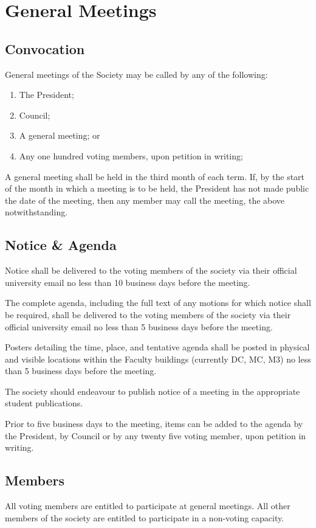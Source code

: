 \section{General Meetings}
\subsection{Convocation}
General meetings of the Society may be called by any of the following:
\begin{enumerate}
  \item The President;
  \item Council;
  \item A general meeting; or
  \item Any one hundred voting members, upon petition in writing;
\end{enumerate}

A general meeting shall be held in the third month of each term. If, by the
start of the month in which a meeting is to be held, the President has not
made public the date of the meeting, then any member may call the meeting, the
above notwithstanding.

\subsection{Notice \& Agenda}

Notice shall be delivered to the voting members of the society via their official university email no less than 10 business days before the meeting.

The complete agenda, including the full text of any motions for which notice shall be required, shall be delivered to the voting members of the society via their official university email no less than 5 business days before the meeting.

Posters detailing the time, place, and tentative agenda shall be posted in physical and visible locations within the Faculty buildings (currently DC, MC, M3) no less than 5 business days before the meeting.

The society should endeavour to publish notice of a meeting in the appropriate student publications.

Prior to five business days to the meeting, items can be added to the agenda by the President, by Council or by any twenty five voting member, upon petition in writing.

\subsection{Members}
All voting members are entitled to participate at general meetings. All other
members of the society are entitled to participate in a non-voting capacity.

